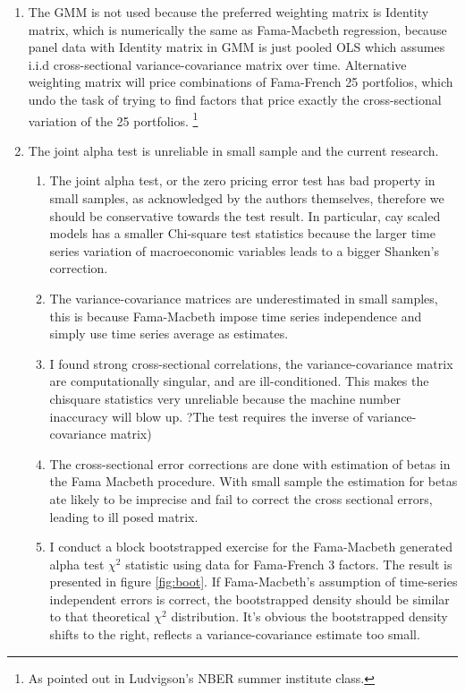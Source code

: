 \documentclass[12pt]{article}
\begin{document}
\begin{enumerate}
 \item The GMM is not used because the preferred weighting matrix is Identity matrix, which is numerically the same as Fama-Macbeth regression, because panel data with Identity matrix in GMM is just pooled OLS which assumes i.i.d cross-sectional variance-covariance matrix over time. Alternative weighting matrix will price combinations of Fama-French 25 portfolios, which undo the task of trying to find factors that price exactly the cross-sectional variation of the 25 portfolios. \footnote{As pointed out in Ludvigson's NBER summer institute class.}
\item The joint alpha test is unreliable in small sample and the current research.
\begin{enumerate}[label=(\alph*)]
 \item The joint alpha test, or the zero pricing error test has bad property in small samples, as acknowledged by the authors themselves, therefore we should be conservative towards the test result. In particular, cay scaled models has a smaller Chi-square test statistics because the larger time series variation of macroeconomic variables leads to a bigger Shanken's correction.
\item The variance-covariance matrices are underestimated in small samples, this is because Fama-Macbeth impose time series independence and simply use time series average as estimates. 
\item I found strong cross-sectional correlations, the variance-covariance matrix are computationally singular, and are ill-conditioned. This makes the chisquare statistics very unreliable because the machine number inaccuracy will blow up. ?The test requires the inverse of variance-covariance matrix)
\item The cross-sectional error corrections are done with estimation of betas in the Fama Macbeth procedure. With small sample the estimation for betas ate likely to be imprecise and fail to correct the cross sectional errors, leading to ill posed matrix.
\item I conduct a block bootstrapped exercise for the Fama-Macbeth generated alpha test $\chi^2$ statistic using data for Fama-French 3 factors. The result is presented in figure \ref{fig:boot}. If Fama-Macbeth's assumption of time-series independent errors is correct, the bootstrapped density should be similar to that theoretical $\chi^2$ distribution. It's obvious the bootstrapped  density shifts to the right, reflects a variance-covariance estimate too small.
\end{enumerate}

\end{enumerate}
\end{document}
